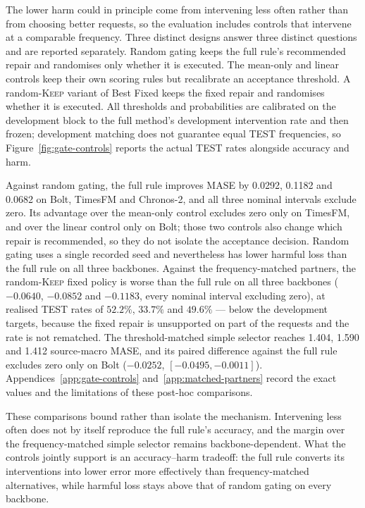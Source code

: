 \documentclass{article}
\begin{document}
The lower harm could in principle come from intervening less often rather than from choosing
better requests, so the evaluation includes controls that intervene at a comparable
frequency. Three distinct designs answer three distinct questions and are reported
separately. Random gating keeps the full rule's recommended repair and randomises only
whether it is executed. The mean-only and linear controls keep their own scoring rules but
recalibrate an acceptance threshold. A random-\textsc{Keep} variant of Best Fixed keeps the
fixed repair and randomises whether it is executed. All thresholds and probabilities are
calibrated on the development block to the full method's development intervention rate and
then frozen; development matching does not guarantee equal TEST frequencies, so
Figure~\ref{fig:gate-controls} reports the actual TEST rates alongside accuracy and harm.

Against random gating, the full rule improves MASE by 0.0292, 0.1182 and 0.0682 on Bolt,
TimesFM and Chronos-2, and all three nominal intervals exclude zero. Its advantage over the
mean-only control excludes zero only on TimesFM, and over the linear control only on Bolt;
those two controls also change which repair is recommended, so they do not isolate the
acceptance decision. Random gating uses a single recorded seed and nevertheless has lower
harmful loss than the full rule on all three backbones. Against the frequency-matched
partners, the random-\textsc{Keep} fixed policy is worse than the full rule on all three
backbones ($-0.0640$, $-0.0852$ and $-0.1183$, every nominal interval excluding zero), at
realised TEST rates of $52.2\%$, $33.7\%$ and $49.6\%$ — below the development targets,
because the fixed repair is unsupported on part of the requests and the rate is not
rematched. The threshold-matched simple selector reaches 1.404, 1.590 and 1.412
source-macro MASE, and its paired difference against the full rule excludes zero only on
Bolt ($-0.0252$, $[-0.0495,-0.0011]$). Appendices~\ref{app:gate-controls}
and~\ref{app:matched-partners} record the exact values and the limitations of these post-hoc
comparisons.

These comparisons bound rather than isolate the mechanism. Intervening less often does not
by itself reproduce the full rule's accuracy, and the margin over the frequency-matched
simple selector remains backbone-dependent. What the controls jointly support is an
accuracy--harm tradeoff: the full rule converts its interventions into lower error more
effectively than frequency-matched alternatives, while harmful loss stays above that of
random gating on every backbone.
\end{document}
